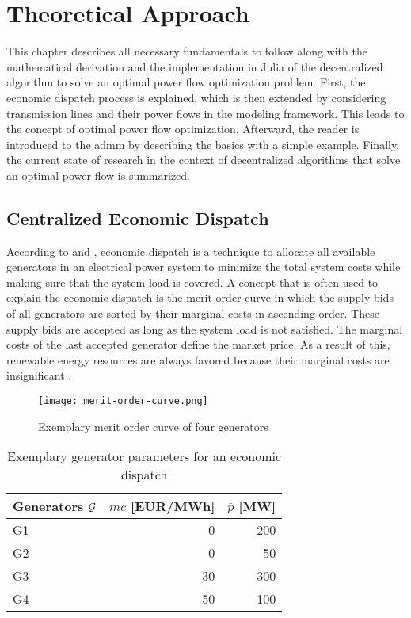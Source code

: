 \section{Theoretical Approach}
\label{sec:theo}

This chapter describes all necessary fundamentals to follow along with the mathematical derivation and the implementation in Julia of the decentralized algorithm to solve an optimal power flow optimization problem. First, the economic dispatch process is explained, which is then extended by considering transmission lines and their power flows in the modeling framework. This leads to the concept of optimal power flow optimization. Afterward, the reader is introduced to the \gls{admm} by describing the basics with a simple example. Finally, the current state of research in the context of decentralized algorithms that solve an optimal power flow is summarized.

\subsection{Centralized Economic Dispatch}
\label{sec:theo:ed}

According to \citet{chowdhury1990} and \citet{hetzer2008}, economic dispatch is a technique to allocate all available generators in an electrical power system to minimize the total system costs while making sure that the system load is covered. A concept that is often used to explain the economic dispatch is the merit order curve in which the supply bids of all generators are sorted by their marginal costs in ascending order. These supply bids are accepted as long as the system load is not satisfied. The marginal costs of the last accepted generator define the market price. As a result of this, renewable energy resources are always favored because their marginal costs are insignificant \citep{hetzer2008}. \\

\begin{figure}[h!]
	\centering
	\texttt{[image: merit-order-curve.png]}
	\caption{Exemplary merit order curve of four generators}
	\label{fig:merit}
\end{figure}

\begin{table}[h!]
    \centering
    \begin{tabular}{lrr}
        Generators $\mathcal{G}$ & $mc$ [EUR/MWh] & $\overline{p}$ [MW] \\ \toprule
        G1 & 0 & 200 \\
        G2 & 0 & 50 \\
        G3 & 30 & 300 \\
        G4 & 50 & 100 \\
        \bottomrule
    \end{tabular}
    \caption{Exemplary generator parameters for an economic dispatch} \label{tab:theo:gen-params}
\end{table}

